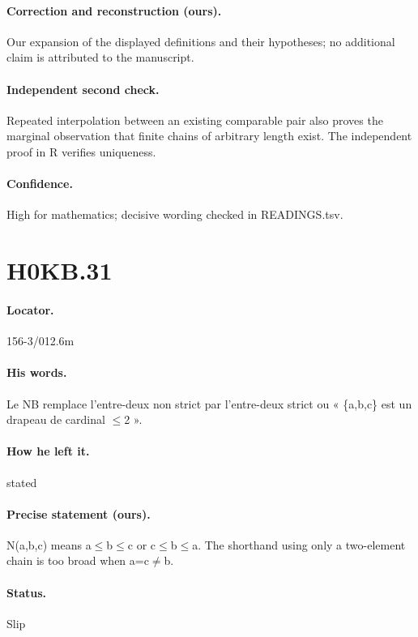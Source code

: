 \paragraph{Correction and reconstruction (ours).} Our expansion of the displayed definitions and their hypotheses; no additional claim is attributed to the manuscript.

\paragraph{Independent second check.} Repeated interpolation between an existing comparable pair also proves the marginal observation that finite chains of arbitrary length exist. The independent proof in R verifies uniqueness.

\paragraph{Confidence.} High for mathematics; decisive wording checked in READINGS.tsv.

\section*{H0KB.31}\label{statement:H0KB.31}
\paragraph{Locator.} 156-3/012.6m

\paragraph{His words.} Le NB remplace l’entre-deux non strict par l’entre-deux strict ou « \{a,b,c\} est un drapeau de cardinal \ensuremath{\leq}2 ».

\paragraph{How he left it.} stated

\paragraph{Precise statement (ours).} N(a,b,c) means a\ensuremath{\leq}b\ensuremath{\leq}c or c\ensuremath{\leq}b\ensuremath{\leq}a. The shorthand using only a two-element chain is too broad when a=c\ensuremath{\ne}b.

\paragraph{Status.} Slip

